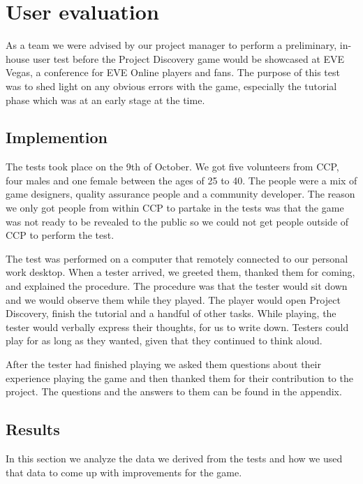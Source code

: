 \section{User evaluation}\label{sec:userevaluation}

As a team we were advised by our project manager to perform a preliminary, in-house user test before the Project Discovery game would be showcased at EVE Vegas, a conference for EVE Online players and fans. The purpose of this test was to shed light on any obvious errors with the game, especially the tutorial phase which was at an early stage at the time.

\subsection{Implemention}
The tests took place on the 9th of October. We got five volunteers from CCP, four males and one female between the ages of 25 to 40. The people were a mix of game designers, quality assurance people and a community developer. The reason we only got people from within CCP to partake in the tests was that the game was not ready to be revealed to the public so we could not get people outside of CCP to perform the test.

The test was performed on a computer that remotely connected to our personal work desktop. When a tester arrived, we greeted them, thanked them for coming, and explained the procedure. The procedure was that the tester would sit down and we would observe them while they played. The player would open Project Discovery, finish the tutorial and a handful of other tasks. While playing, the tester would verbally express their thoughts, for us to write down. Testers could play for as long as they wanted, given that they continued to think aloud.

After the tester had finished playing we asked them questions about their experience playing the game and then thanked them for their contribution to the project. The questions and the answers to them can be found in the appendix.

\subsection{Results}

In this section we analyze the data we derived from the tests and how we used that data to come up with improvements for the game.

